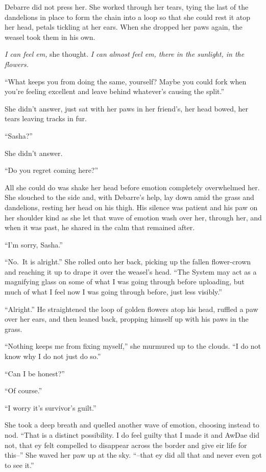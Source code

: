 Debarre did not press her. She worked through her tears, tying the last of the dandelions in place to form the chain into a loop so that she could rest it atop her head, petals tickling at her ears. When she dropped her paws again, the weasel took them in his own.

\emph{I can feel em,} she thought. \emph{I can almost feel em, there in the sunlight, in the flowers.}

``What keeps you from doing the same, yourself? Maybe you could fork when you're feeling excellent and leave behind whatever's causing the split.''

She didn't answer, just sat with her paws in her friend's, her head bowed, her tears leaving tracks in fur.

``Sasha?''

She didn't answer.

``Do you regret coming here?''

All she could do was shake her head before emotion completely overwhelmed her. She slouched to the side and, with Debarre's help, lay down amid the grass and dandelions, resting her head on his thigh. His silence was patient and his paw on her shoulder kind as she let that wave of emotion wash over her, through her, and when it was past, he shared in the calm that remained after.

``I'm sorry, Sasha.''

``No.~It is alright.'' She rolled onto her back, picking up the fallen flower-crown and reaching it up to drape it over the weasel's head. ``The System may act as a magnifying glass on some of what I was going through before uploading, but much of what I feel now I was going through before, just less visibly.''

``Alright.'' He straightened the loop of golden flowers atop his head, ruffled a paw over her ears, and then leaned back, propping himself up with his paws in the grass.

``Nothing keeps me from fixing myself,'' she murmured up to the clouds. ``I do not know why I do not just do so.''

``Can I be honest?''

``Of course.''

``I worry it's survivor's guilt.''

She took a deep breath and quelled another wave of emotion, choosing instead to nod. ``That is a distinct possibility. I do feel guilty that I made it and AwDae did not, that ey felt compelled to disappear across the border and give eir life for this--'' She waved her paw up at the sky. ``--that ey did all that and never even got to see it.''

